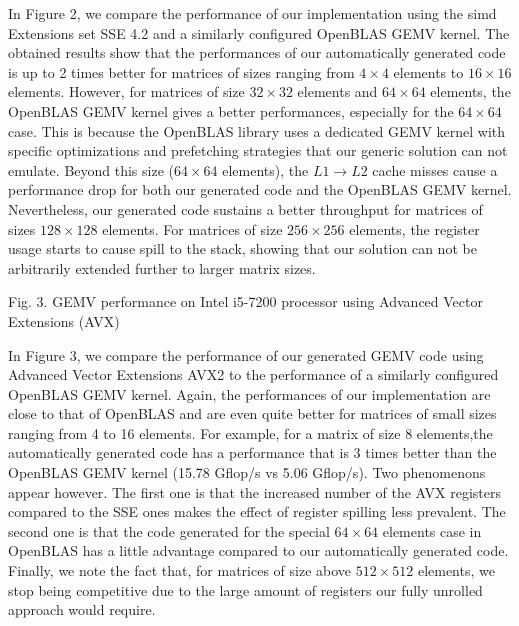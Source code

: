 \documentclass[../main]{subfiles}
\begin{document}
In Figure 2, we compare the performance of our implementation
using the \gls{simd} Extensions set SSE 4.2 and a similarly
configured OpenBLAS GEMV kernel. The obtained results show
that the performances of our automatically generated code is
up to 2 times better for matrices of sizes ranging from $4 \times 4$
elements to $16 \times 16$ elements. However, for matrices of size
$32 \times 32$ elements and $64 \times 64$ elements, the OpenBLAS GEMV
kernel gives a better performances, especially for the $64 \times 64$
case. This is because the OpenBLAS library uses a dedicated
GEMV kernel with specific optimizations and prefetching
strategies that our generic solution can not emulate. Beyond
this size ($64 \times 64$ elements), the $L1 \rightarrow L2$ cache misses
cause a performance drop for both our generated code and
the OpenBLAS GEMV kernel. Nevertheless, our generated code
sustains a better throughput for matrices of sizes $128 \times 128$
elements. For matrices of size $256 \times 256$ elements, the register
usage starts to cause spill to the stack, showing that our
solution can not be arbitrarily extended further to larger matrix sizes.


Fig. 3. GEMV performance on Intel i5-7200 processor using Advanced Vector
Extensions (AVX)

In Figure 3, we compare the performance of our generated
GEMV code using Advanced Vector Extensions AVX2 to the
performance of a similarly configured OpenBLAS GEMV kernel.
Again, the performances of our implementation are close
to that of OpenBLAS and are even quite better for matrices of
small sizes ranging from 4 to 16 elements. For example, for a
matrix of size 8 elements,the automatically generated code has
a performance that is 3 times better than the OpenBLAS GEMV
kernel (15.78 Gflop/s vs 5.06 Gflop/s). Two phenomenons
appear however. The first one is that the increased number
of the AVX registers compared to the SSE ones makes the
effect of register spilling less prevalent. The second one is
that the code generated for the special $64 \times 64$ elements
case\cite{hpcs23} in OpenBLAS has a little advantage compared to
our automatically generated code. Finally, we note the fact
that, for matrices of size above $512 \times 512$ elements, we stop
being competitive due to the large amount of registers our
fully unrolled approach would require.
\end{document}
